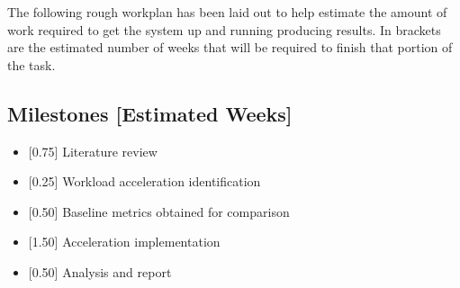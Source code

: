 \documentclass[10pt, oneside, letterpaper]{article}
\begin{document}
The following rough workplan has been laid out to help estimate the amount of work required to get the system up and running producing results. In brackets are the estimated number of weeks that will be required to finish that portion of the task.

\subsection{Milestones [Estimated Weeks]}

\begin{itemize}
  \item {[0.75]} Literature review
  \item {[0.25]} Workload acceleration identification
  \item {[0.50]} Baseline metrics obtained for comparison
  \item {[1.50]} Acceleration implementation
  \item {[0.50]} Analysis and report
\end{itemize}

\nocite{*}



\end{document}
